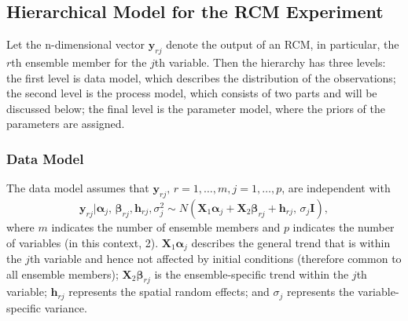 \documentclass{article}
\begin{document}
\subsection{Hierarchical Model for the RCM Experiment}
Let the n-dimensional vector $\boldsymbol{y}_{rj}$ denote the output of an RCM, in particular, the $r$th ensemble member for the $j$th variable. Then the hierarchy has three levels: the first level is data model, which describes the distribution of the observations; the second level is the process model, which consists of two parts and will be discussed below; the final level is the parameter model, where the priors of the parameters are assigned.

\subsubsection{Data Model}
The data model assumes that $\boldsymbol{y}_{rj}, \, r =1, \dots,m,j =1, \dots,p$, are independent with
$$\boldsymbol{y}_{rj} | \boldsymbol{\alpha}_j, \, \boldsymbol{\beta}_{rj}, \boldsymbol{h}_{rj}, \sigma^2_j \sim N(\boldsymbol{X}_1 \boldsymbol{\alpha}_j + \boldsymbol{X}_2 \boldsymbol{\beta}_{rj} + \boldsymbol{h}_{rj}, \, \sigma_j \boldsymbol{I}),$$
where $m$ indicates the number of ensemble members and $p$ indicates the number of variables (in this context, 2). $\boldsymbol{X}_1 \boldsymbol{\alpha}_j$ describes the general trend that is within the $j$th variable and hence not affected by initial conditions (therefore common to all ensemble members); $\boldsymbol{X}_2 \boldsymbol{\beta}_{rj}$ is the ensemble-specific trend within the $j$th variable; $\boldsymbol{h}_{rj}$ represents the spatial random effects; and $\sigma_j$ represents the variable-specific variance.
\end{document}
